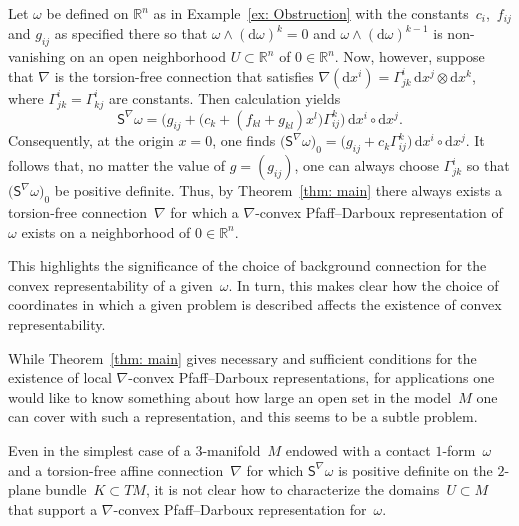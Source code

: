 \documentclass[10pt,a4paper]{amsart}
\renewcommand{\d}{\mathrm{d}}%
\newcommand{\Ss}{\mathsf{S}}
\newcommand{\w}{\wedge}
\numberwithin{equation}{section}
\begin{document}
\begin{Example}%
Let $\omega$ be defined on $\mathbb{R}^n$ as in Example~\ref{ex: Obstruction}
with the constants~$c_i$,~$f_{ij}$ and $g_{ij}$ as specified there
so that $\omega\w (\d\omega)^k=0$ and $\omega\w(\d\omega)^{k-1}$
is non-vanishing on an open neighborhood $U\subset\mathbb{R}^n$ of $0\in\mathbb{R}^n$. Now, however, suppose that $\nabla$ is the
torsion-free connection that satisfies $\nabla(\d x^i) = \Gamma^i_{jk}\,\d x^j\otimes \d x^k$, where $\Gamma^i_{jk}=\Gamma^i_{kj}$ are constants.
Then calculation yields
\[
\Ss^\nabla\omega
= \bigl(g_{ij}+\bigl(c_k+(f_{kl}+g_{kl})x^l\bigr)\Gamma^k_{ij}\bigr)
\,\d x^i\circ\d x^j.
\]
Consequently, at the origin $x=0$, one finds $\big(\Ss^\nabla\omega\big)_0
= \bigl(g_{ij}+c_k\Gamma^k_{ij}\bigr)\,\d x^i\circ\d x^j$. It follows
that, no matter the value of $g = (g_{ij})$, one can always choose
$\Gamma^i_{jk}$ so that $\big(\Ss^\nabla\omega\big)_0$
be positive definite.
Thus, by Theorem~\ref{thm: main} there always exists a
torsion-free connection~$\nabla$
for which a $\nabla$-convex Pfaff--Darboux representation of $\omega$
exists on a neighborhood of $0\in\mathbb{R}^n$.

This highlights the significance of the choice of background connection
for the convex representability of a given~$\omega$. In turn,
this makes clear how the choice of coordinates in which a given
problem is described affects the existence of convex representability.
\end{Example}

\begin{Remark}
While Theorem~\ref{thm: main} gives necessary and sufficient conditions
for the existence of local $\nabla$-convex Pfaff--Darboux representations,
for applications one would like to know something about how large an open
set in the model~$M$ one can cover with such a representation,
and this seems to be a subtle problem.

Even in the simplest case of a $3$-manifold~$M$
endowed with a contact $1$-form~$\omega$
and a torsion-free affine connection~$\nabla$
for which $\Ss^\nabla\omega$ is positive definite
on the $2$-plane bundle~$K\subset TM$,
it is not clear how to characterize the domains~$U\subset M$
that support a $\nabla$-convex Pfaff--Darboux representation for~$\omega$.
\end{Remark}
\end{document}
